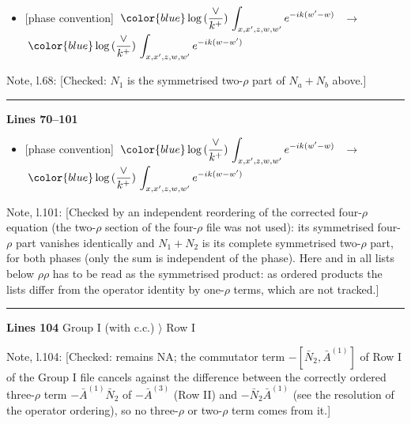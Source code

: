 \documentclass[10pt]{article}
\newenvironment{notebox}{\def\FrameCommand{{\color{notebar}\vrule width 1.5pt}\hspace{6pt}}\MakeFramed{\advance\hsize-\width\FrameRestore}\small}{\endMakeFramed}
\begin{document}
\begin{itemize}[leftmargin=2.2em,itemsep=1pt,topsep=2pt]
\item[\textbf{l.48}] \textsf{\small [phase convention]} $\displaystyle \,{\color{blue}\log{(\frac{\vee}{k^{+}})}}\,\int_{x,x',z,w,w'}e^{-ik(w'-w)}\,$\ $\longrightarrow$\ $\displaystyle \,{\color{blue}\log{(\frac{\vee}{k^{+}})}}\,\int_{x,x',z,w,w'}e^{-ik(w-w')}\,$
\end{itemize}
\begin{notebox}\textsf{\small Note, l.68:} [Checked: $N_{1}$ is the symmetrised two-$\rho$ part of $N_{a}+N_{b}$ above.]\end{notebox}
\noindent\rule{\linewidth}{0.3pt}\par\noindent\textbf{Lines 70--101} \par
\begin{itemize}[leftmargin=2.2em,itemsep=1pt,topsep=2pt]
\item[\textbf{l.70}] \textsf{\small [phase convention]} $\displaystyle \,{\color{blue}\log{(\frac{\vee}{k^{+}})}}\,\int_{x,x',z,w,w'}e^{-ik(w'-w)}\,$\ $\longrightarrow$\ $\displaystyle \,{\color{blue}\log{(\frac{\vee}{k^{+}})}}\,\int_{x,x',z,w,w'}e^{-ik(w-w')}\,$
\end{itemize}
\begin{notebox}\textsf{\small Note, l.101:} [Checked by an independent reordering of the corrected four-$\rho$ equation (the two-$\rho$ section of the four-$\rho$ file was not used): its symmetrised four-$\rho$ part vanishes identically and $N_{1}+N_{2}$ is its complete symmetrised two-$\rho$ part, for both phases (only the sum is independent of the phase). Here and in all lists below $\rho\rho$ has to be read as the symmetrised product: as ordered products the lists differ from the operator identity by one-$\rho$ terms, which are not tracked.]\end{notebox}
\noindent\rule{\linewidth}{0.3pt}\par\noindent\textbf{Lines 104} \quad \textsf{Group I (with c.c.) $\rangle$ Row I}\par
\begin{notebox}\textsf{\small Note, l.104:} [Checked: remains NA; the commutator term $-[\bar N_{2},\bar A^{(1)}]$ of Row I of the Group I file cancels against the difference between the correctly ordered three-$\rho$ term $-\bar A^{(1)}\bar N_{2}$ of $-\bar A^{(3)}$ (Row II) and $-\bar N_{2}\bar A^{(1)}$ (see the resolution of the operator ordering), so no three-$\rho$ or two-$\rho$ term comes from it.]\end{notebox}
\end{document}
